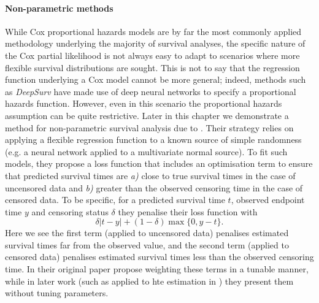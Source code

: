 \documentclass[../thesis.tex]{subfiles}
\begin{document}
\paragraph{Non-parametric methods} \label{sec:nonparametric}
While Cox proportional hazards models are by far the most commonly applied methodology underlying the majority of survival analyses, the specific nature of the Cox partial likelihood is not always easy to adapt to scenarios where more flexible survival distributions are sought. This is not to say that the regression function underlying a Cox model cannot be more general; indeed, methods such as \emph{DeepSurv} \citep{katzman_deepsurv_2018} have made use of deep neural networks to specify a proportional hazards function. However, even in this scenario the proportional hazards assumption can be quite restrictive. Later in this chapter we demonstrate a method for non-parametric survival analysis due to \citet{chapfuwa_adversarial_2018}. Their strategy relies on applying a flexible regression function to a known source of simple randomness (e.g. a neural network applied to a multivariate normal source). To fit such models, they propose a loss function that includes an optimisation term to ensure that predicted survival times are \emph{a)} close to true survival times in the case of uncensored data and \emph{b)} greater than the observed censoring time in the case of censored data. To be specific, for a predicted survival time $t$, observed endpoint time $y$ and censoring status $\delta$ they penalise their loss function with 
\[\delta |t-y| + (1-\delta)\max\{0, y - t\}. \]
Here we see the first term (applied to uncensored data) penalises estimated survival times far from the observed value, and the second term (applied to censored data) penalises estimated survival times less than the observed censoring time. In their original paper \citet{chapfuwa_adversarial_2018} propose weighting these terms in a tunable manner, while in later work (such as applied to \gls{hte} estimation in \citealp{chapfuwa_enabling_2021}) they present them without tuning parameters. 
\end{document}

